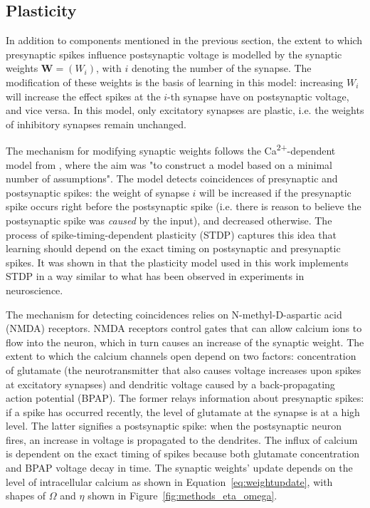 \documentclass[a4paper,12pt]{report}
\theoremstyle{definition}
\begin{document}




\subsection{Plasticity}

In addition to components mentioned in the previous section, the extent to which presynaptic spikes influence postsynaptic voltage is modelled by the synaptic weights $\boldsymbol{W}=(W_i)$, with $i$ denoting the number of the synapse. The modification of these weights is the basis of learning in this model: increasing $W_i$ will increase the effect spikes at the $i$-th synapse have on postsynaptic voltage, and vice versa. In this model, only excitatory synapses are plastic, i.e. the weights of inhibitory synapses remain unchanged.

The mechanism for modifying synaptic weights follows the Ca\textsuperscript{2+}-dependent model from \cite{shouval2002unified}, where the aim was "to construct a model based on a minimal number of assumptions". The model detects coincidences of presynaptic and postsynaptic spikes: the weight of synapse $i$ will be increased if the presynaptic spike occurs right before the postsynaptic spike (i.e. there is reason to believe the postsynaptic spike was \emph{caused} by the input), and decreased otherwise. The process of spike-timing-dependent plasticity (STDP) captures this idea that learning should depend on the exact timing on postsynaptic and presynaptic spikes. It was shown in \cite{shouval2002unified} that the plasticity model used in this work implements STDP in a way similar to what has been observed in experiments in neuroscience.

The mechanism for detecting coincidences relies on N-methyl-D-aspartic acid (NMDA) receptors. NMDA receptors control gates that can allow calcium ions to flow into the neuron, which in turn causes an increase of the synaptic weight. The extent to which the calcium channels open depend on two factors: concentration of glutamate (the neurotransmitter that also causes voltage increases upon spikes at excitatory synapses) and dendritic voltage caused by a back-propagating action potential (BPAP). The former relays information about presynaptic spikes: if a spike has occurred recently, the level of glutamate at the synapse is at a high level. The latter signifies a postsynaptic spike: when the postsynaptic neuron fires, an increase in voltage is propagated to the dendrites. The influx of calcium is dependent on the exact timing of spikes because both glutamate concentration and BPAP voltage decay in time. The synaptic weights' update depends on the level of intracellular calcium as shown in Equation~\ref{eq:weightupdate}, with shapes of $\Omega$ and $\eta$ shown in Figure~\ref{fig:methods_eta_omega}.
\end{document}
